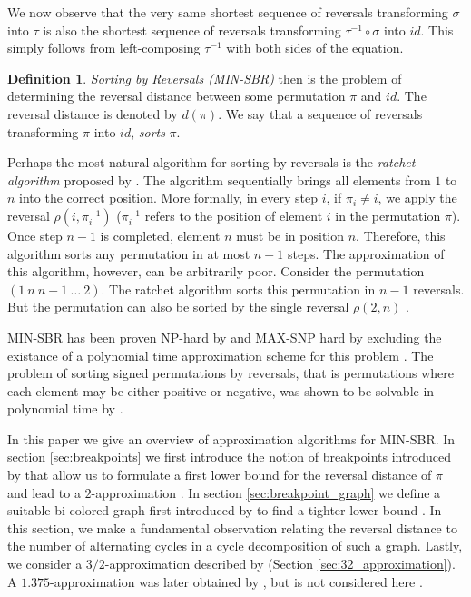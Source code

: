\documentclass[11pt,DIV=11]{scrartcl}
\theoremstyle{definition}
\newtheorem{definition}[theorem]{Definition}
\theoremstyle{remark}
\begin{document}
We now observe that the very same shortest sequence of reversals transforming $\sigma$ into $\tau$ is also the shortest sequence of reversals transforming $\tau^{-1} \circ \sigma$ into $id$. This simply follows from left-composing $\tau^{-1}$ with both sides of the equation.

\begin{definition}
\textit{Sorting by Reversals (MIN-SBR)} then is the problem of determining the reversal distance between some permutation $\pi$ and $id$. The reversal distance is denoted by $d(\pi)$. We say that a sequence of reversals transforming $\pi$ into $id$, \textit{sorts} $\pi$.
\end{definition}

Perhaps the most natural algorithm for sorting by reversals is the \textit{ratchet algorithm} proposed by \citeauthor*{Watterson19821} \cite{Watterson19821}. The algorithm sequentially brings all elements from $1$ to $n$ into the correct position. More formally, in every step $i$, if $\pi_i \neq i$, we apply the reversal $\rho(i, \pi_i^{-1})$ ($\pi_i^{-1}$ refers to the position of element $i$ in the permutation $\pi$). Once step $n-1$ is completed, element $n$ must be in position $n$. Therefore, this algorithm sorts any permutation in at most $n-1$ steps. The approximation of this algorithm, however, can be arbitrarily poor. Consider the permutation $(1\ n\ n-1\ \dots\ 2)$. The ratchet algorithm sorts this permutation in $n-1$ reversals. But the permutation can also be sorted by the single reversal $\rho(2, n)$ \cite{Kececioglu1995}.

MIN-SBR has been proven NP-hard by \citeauthor*{Caprara1997} \cite{Caprara1997} and MAX-SNP hard by \citeauthor*{Berman1999} excluding the existance of a polynomial time approximation scheme for this problem \cite{Berman1999}. The problem of sorting signed permutations by reversals, that is permutations where each element may be either positive or negative, was shown to be solvable in polynomial time by \citeauthor*{Hannenhalli1995} \cite{Hannenhalli1995}.

In this paper we give an overview of approximation algorithms for MIN-SBR. In section \ref{sec:breakpoints} we first introduce the notion of breakpoints introduced by \citeauthor*{Kececioglu1995} that allow us to formulate a first lower bound for the reversal distance of $\pi$ and lead to a $2$-approximation \cite{Kececioglu1995}. In section \ref{sec:breakpoint_graph} we define a suitable bi-colored graph first introduced by \citeauthor*{Bafna1996} to find a tighter lower bound \cite{Bafna1996}. In this section, we make a fundamental observation relating the reversal distance to the number of alternating cycles in a cycle decomposition of such a graph. Lastly, we consider a $3/2$-approximation described by \citeauthor{Christie1998} \cite{Christie1998} (Section \ref{sec:32_approximation}). A $1.375$-approximation was later obtained by \citeauthor*{Berman2001}, but is not considered here \cite{Berman2001}.
\end{document}
